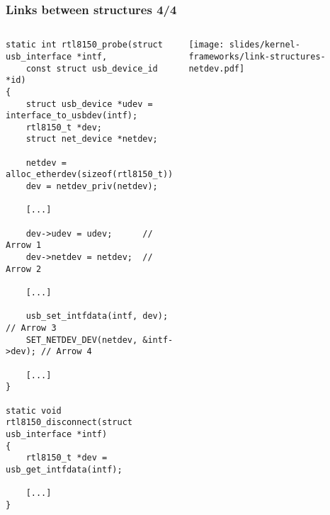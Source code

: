 \begin{frame}[fragile]
  \frametitle{Links between structures 4/4}
  \begin{columns}
    \begin{verbatim}
static int rtl8150_probe(struct usb_interface *intf,
    const struct usb_device_id *id)
{
    struct usb_device *udev = interface_to_usbdev(intf);
    rtl8150_t *dev;
    struct net_device *netdev;

    netdev = alloc_etherdev(sizeof(rtl8150_t));
    dev = netdev_priv(netdev);

    [...]

    dev->udev = udev;      // Arrow 1
    dev->netdev = netdev;  // Arrow 2

    [...]

    usb_set_intfdata(intf, dev);        // Arrow 3
    SET_NETDEV_DEV(netdev, &intf->dev); // Arrow 4

    [...]
}

static void rtl8150_disconnect(struct usb_interface *intf)
{
    rtl8150_t *dev = usb_get_intfdata(intf);

    [...]
}
    \end{verbatim}
    \begin{center}
      \texttt{[image: slides/kernel-frameworks/link-structures-netdev.pdf]}
    \end{center}
  \end{columns}
\end{frame}
